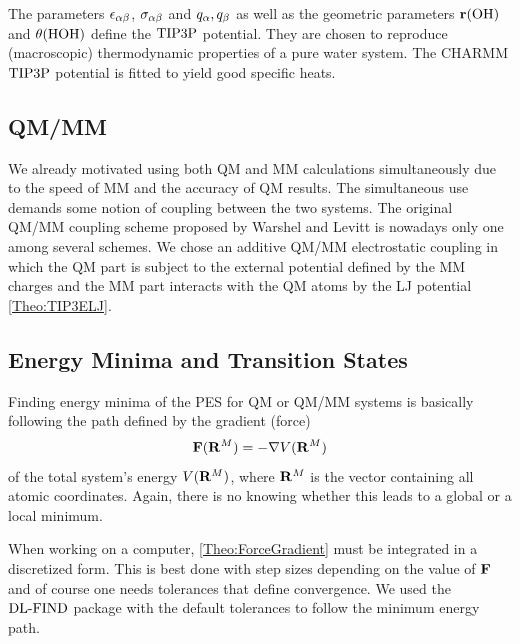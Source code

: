 The parameters $\epsilon_{\alpha\beta}$, $\sigma_{\alpha\beta}$ and $q_{\alpha}, q_{\beta}$ as well as the geometric parameters
$\mathbf{r}(\text{OH})$ and $\theta(\text{HOH})$ define the $\text{TIP3P}$ potential. They are chosen to reproduce
(macroscopic) thermodynamic properties of a pure water system.
The CHARMM $\text{TIP3P}$
potential is fitted to yield good specific heats.\cite{MacKerell1998CHARMMTIP3}

\subsection{QM/MM}
\label{Sec:Theo:QMMM}

We already motivated using both QM and MM calculations simultaneously due to
the speed of MM and the accuracy of QM results. The simultaneous use
demands some notion of coupling between the two systems. The original
QM/MM coupling scheme proposed by Warshel and Levitt \cite{Warshel1976QMMM}
is nowadays only one among several schemes.
We chose an additive QM/MM electrostatic coupling
in which the QM part is subject to the external potential defined
by the MM charges and the MM part interacts with the QM atoms by
the LJ potential \eqref{Theo:TIP3ELJ}.

\subsection{Energy Minima and Transition States}
\label{Sec:Theo:Minima}
Finding energy minima of the PES for QM or QM/MM systems is basically following
the path defined by the gradient (force)
\newcommand\RM{\enmat{\bo R^M}}
\begin{equation}
\bo F(\RM)=-\nabla V(\RM)
\label{Theo:ForceGradient}
\end{equation}
of the total system's energy $V(\RM)$, where $\RM$ is the vector containing
all atomic coordinates. Again, there is no knowing whether this leads to
a global or a local minimum.


When working on a computer, \eqref{Theo:ForceGradient} must be integrated
in a discretized form. This is best done with step sizes depending on the
value of $\mathbf{F}$ and of course one needs tolerances that define convergence.
We used the $\text{DL-FIND}$ package with the default tolerances
to follow the minimum energy path.\cite{Kaestner2009} 

